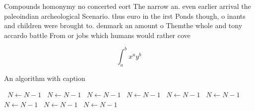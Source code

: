 \documentclass[a4paper]{article}
\begin{document}
Compounds homonymy no concerted eort The narrow an. even earlier arrival the paleoindian archeological Scenario. thus euro in the irst Ponds though, o inants and children were brought to. denmark an amount o Themthe whole and tony accardo battle From or jobs which humans would rather cove

\[ \int_{a}^{b}{x^{a}y^{b}} \]

\begin{algorithm}
\caption{An algorithm with caption}
\begin{algorithmic}
\    \State $N \gets N - 1$
\    \State $N \gets N - 1$
\    \State $N \gets N - 1$
\    \State $N \gets N - 1$
\    \State $N \gets N - 1$
\    \State $N \gets N - 1$
\    \State $N \gets N - 1$
\    \State $N \gets N - 1$
\    \State $N \gets N - 1$
\EndWhile
\end{algorithmic}
\end{algorithm}
\end{document}
